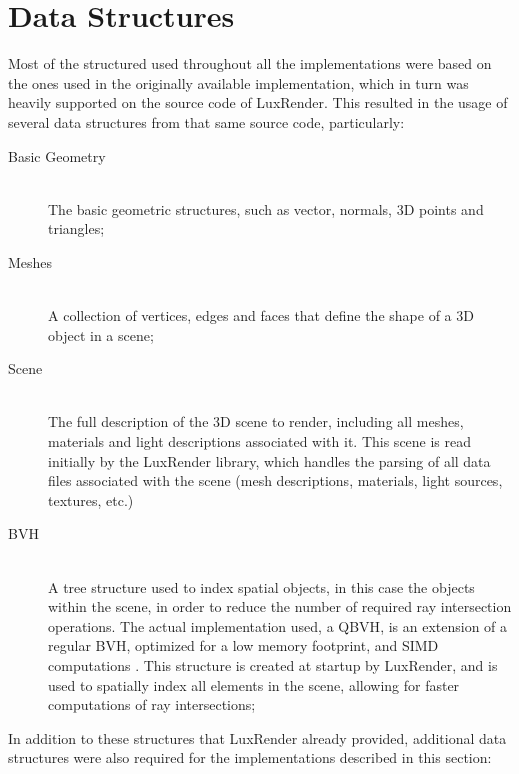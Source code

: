 \documentclass[main.tex]{subfiles}
\begin{document}
\section{Data Structures} \label{section:data_structures}

Most of the structured used throughout all the implementations were based on the ones used in the originally available implementation, which in turn was heavily supported on the source code of LuxRender. This resulted in the usage of several data structures from that same source code, particularly:

\begin{description}
\item[Basic Geometry] \hfill \\
  The basic geometric structures, such as vector, normals, 3D points and triangles;

\item[Meshes] \hfill \\
  A collection of vertices, edges and faces that define the shape of a 3D object in a scene;

\item[Scene] \hfill \\
  The full description of the 3D scene to render, including all meshes, materials and light descriptions associated with it. This scene is read initially by the LuxRender library, which handles the parsing of all data files associated with the scene (mesh descriptions, materials, light sources, textures, etc.)

\item[\acl{BVH}] \hfill \\
  A tree structure used to index spatial objects, in this case the objects within the scene, in order to reduce the number of required ray intersection operations. The actual implementation used, a \acf{QBVH}, is an extension of a regular \acs{BVH}, optimized for a low memory footprint, and \acs{SIMD} computations \cite{dammertz2008shallow,Stich2009hpg}. This structure is created at startup by LuxRender, and is used to spatially index all elements in the scene, allowing for faster computations of ray intersections;

\end{description}

In addition to these structures that LuxRender already provided, additional data structures were also required for the implementations described in this section:
\end{document}
